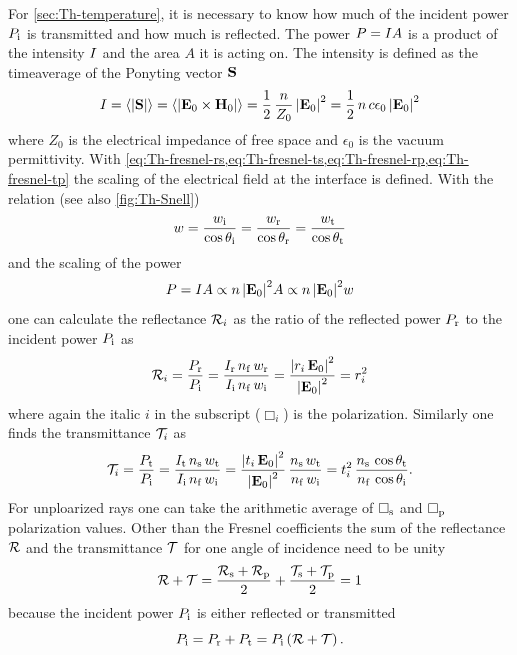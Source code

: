 For \cref{sec:Th-temperature}, it is necessary to know how much of the incident 
power $P_{\mathrm{i}}$ is transmitted and how much is reflected. The power 
$P=I A$ is a product of the intensity $I$ and the area $A$ it 
is acting on. The intensity is defined as the timeaverage of the Ponyting 
vector $\vb{S}$
\begin{equation}
  I = \left\langle \abs{\vb{S}} \right\rangle = 
  \left\langle \abs{\vb{E}_{0}\times\vb{H}_{0}} \right\rangle = 
  \frac{1}{2}\,\frac{n}{Z_{0}}\,\abs{\vb{E}_{0}}^{2} = 
  \frac{1}{2}\,n\,c\epsilon_{0}\,\abs{\vb{E}_{0}}^{2}
\end{equation}
where $Z_{0}$ is the electrical impedance of free space and $\epsilon_{0}$ is 
the vacuum permittivity. With 
\cref{eq:Th-fresnel-rs,eq:Th-fresnel-ts,eq:Th-fresnel-rp,eq:Th-fresnel-tp} the 
scaling of the electrical field at the interface is defined. With the relation 
(see also \cref{fig:Th-Snell})
\begin{equation}
  w = \frac{w_{\mathrm{i}}}{\cos\theta_{\mathrm{i}}} = \frac{w_{\mathrm{r}}}{\cos\theta_{\mathrm{r}}} = 
  \frac{w_{\mathrm{t}}}{\cos\theta_{\mathrm{t}}}
  \label{eq:Th-area}
\end{equation}
and the scaling of the power
\begin{equation}
  P = I A \propto n\,\abs{\vb{E}_{0}}^{2}A \propto
  n\,\abs{\vb{E}_{0}}^{2}w
\end{equation}
one can calculate the reflectance $\mathcal{R}_{i}$ as the ratio of the reflected 
power $P_{\mathrm{r}}$ to the incident power $P_{\mathrm{i}}$ as
\begin{equation}
  \mathcal{R}_{i} = \frac{P_{\mathrm{r}}}{P_{\mathrm{i}}} = 
  \frac{I_{\mathrm{r}}\,n_{\mathrm{f}}\,w_{\mathrm{r}}}{I_{\mathrm{i}}\,n_{\mathrm{f}}\,w_{\mathrm{i}}} 
  =\frac{\abs{r_{i}\,\vb{E}_{0}}^{2}}{\abs{\vb{E}_{0}}^{2}} = 
  r_{i}^{2}
\end{equation}
where again the italic $i$ in the subscript ($\Box_{i}$) is the polarization. 
Similarly one finds the transmittance $\mathcal{T}_{i}$ as
\begin{equation}
  \mathcal{T}_{i} = \frac{P_{\mathrm{t}}}{P_{\mathrm{i}}} = 
  \frac{I_{\mathrm{t}}\,n_{\mathrm{s}}\,w_{\mathrm{t}}}{I_{\mathrm{i}}\,n_{\mathrm{f}}\,w_{\mathrm{i}}} 
  =\frac{\abs{t_{i}\,\vb{E}_{0}}^{2}}{\abs{\vb{E}_{0}}^{2}}\,\frac{n_{\mathrm{s}}\,w_{\mathrm{t}}}{n_{\mathrm{f}}\,w_{\mathrm{i}}} 
  = t_{i}^{2}\,\frac{n_{\mathrm{s}}\,\cos\theta_{\mathrm{t}}}{n_{\mathrm{f}}\,\cos\theta_{\mathrm{i}}}.
\end{equation}
For unploarized rays one can take the arithmetic average of $\Box_{\mathrm{s}}$ and 
$\Box_{\mathrm{p}}$ polarization values. Other than the Fresnel coefficients the 
sum of the reflectance $\mathcal{R}$ and the transmittance $\mathcal{T}$ for one 
angle of incidence need to be unity
\begin{equation}
  \mathcal{R} + \mathcal{T} = 
  \frac{\mathcal{R}_{\mathrm{s}}+\mathcal{R}_{\mathrm{p}}}{2} +
  \frac{\mathcal{T}_{\mathrm{s}}+\mathcal{T}_{\mathrm{p}}}{2} = 1 
  \label{eq:Th-fresnel}
\end{equation}
because the incident power $P_{\mathrm{i}}$ is either reflected or transmitted
\begin{equation}
  P_{\mathrm{i}} = P_{\mathrm{r}} + P_{\mathrm{t}} = P_{\mathrm{i}}\left( \mathcal{R} + \mathcal{T} 
  \right).
\end{equation}

